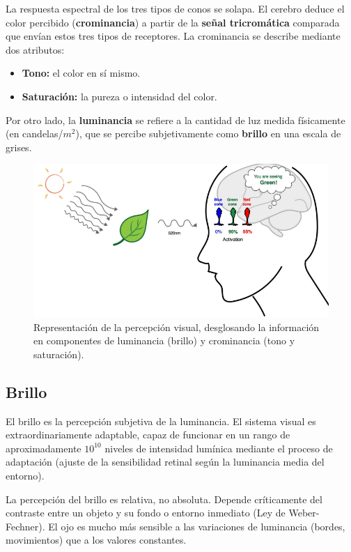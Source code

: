 La respuesta espectral de los tres tipos de conos se solapa. El cerebro deduce el color percibido (\textbf{crominancia}) a partir de la \textbf{señal tricromática} comparada que envían estos tres tipos de receptores. La crominancia se describe mediante dos atributos:
\begin{itemize}
\item \textbf{Tono:} el color en sí mismo.
\item \textbf{Saturación:} la pureza o intensidad del color.
\end{itemize}

Por otro lado, la \textbf{luminancia} se refiere a la cantidad de luz medida físicamente (en candelas/$m^2$), que se percibe subjetivamente como \textbf{brillo} en una escala de grises.


\begin{figure}[h]
\centering
\includegraphics[width = \textwidth]{figs/perception.png}
\caption{Representación de la percepción visual, desglosando la información en componentes de luminancia (brillo) y crominancia (tono y saturación).}
\end{figure}

\subsection{Brillo}
El brillo es la percepción subjetiva de la luminancia. El sistema visual es extraordinariamente adaptable, capaz de funcionar en un rango de aproximadamente $10^{10}$ niveles de intensidad lumínica mediante el proceso de adaptación (ajuste de la sensibilidad retinal según la luminancia media del entorno).

La percepción del brillo es relativa, no absoluta. Depende críticamente del contraste entre un objeto y su fondo o entorno inmediato (Ley de Weber-Fechner). El ojo es mucho más sensible a las variaciones de luminancia (bordes, movimientos) que a los valores constantes.

